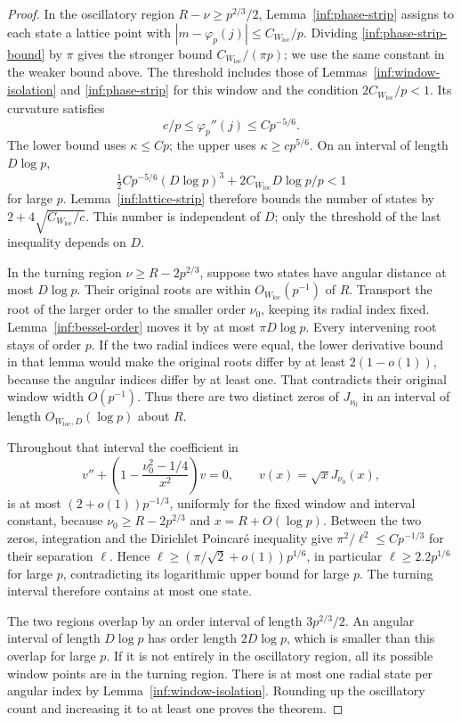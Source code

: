 \begin{proof}
In the oscillatory region $R-\nu\ge p^{2/3}/2$,
Lemma~\ref{inf:phase-strip} assigns to each state a lattice point
with $|m-\varphi_p(j)|\le C_{W_{\mathrm{loc}}}/p$.
Dividing \eqref{inf:phase-strip-bound} by $\pi$ gives the
stronger bound $C_{W_{\mathrm{loc}}}/(\pi p)$; we use the same
constant in the weaker bound above. The threshold includes those
of Lemmas~\ref{inf:window-isolation} and \ref{inf:phase-strip}
for this window and the condition $2C_{W_{\mathrm{loc}}}/p<1$.
Its curvature satisfies
\[
 c/p\le\varphi_p''(j)\le Cp^{-5/6}.
\]
The lower bound uses $\kappa\le Cp$; the upper uses
$\kappa\ge cp^{5/6}$. On an interval of length $D\log p$,
\[
 \tfrac12Cp^{-5/6}(D\log p)^3
       +2C_{W_{\mathrm{loc}}}D\log p/p<1
\]
for large $p$. Lemma~\ref{inf:lattice-strip} therefore bounds the
number of states by
$2+4\sqrt{C_{W_{\mathrm{loc}}}/c}$.
This number is independent of $D$; only the threshold of the
last inequality depends on $D$.

In the turning region $\nu\ge R-2p^{2/3}$, suppose two states
have angular distance at most $D\log p$.
Their original roots are within $O_{W_{\mathrm{loc}}}(p^{-1})$
of $R$. Transport the root of the larger order to the smaller
order $\nu_0$, keeping its radial index fixed.
Lemma~\ref{inf:bessel-order} moves it by at most
$\pi D\log p$. Every intervening root stays of order $p$.
If the two radial indices were equal, the lower derivative bound
in that lemma would make the original roots differ by at least
$2(1-o(1))$, because the angular indices differ by at least one.
That contradicts their original window width $O(p^{-1})$.
Thus there are two distinct zeros of $J_{\nu_0}$ in an interval
of length $O_{W_{\mathrm{loc}},D}(\log p)$ about $R$.

Throughout that interval the coefficient in
\[
 v''+\left(1-\frac{\nu_0^2-1/4}{x^2}\right)v=0,
 \qquad v(x)=\sqrt xJ_{\nu_0}(x),
\]
is at most $(2+o(1))p^{-1/3}$, uniformly for the fixed window
and interval constant, because
$\nu_0\ge R-2p^{2/3}$ and $x=R+O(\log p)$.
Between the two zeros, integration and the Dirichlet Poincar\'e
inequality give
$\pi^2/\ell^2\le Cp^{-1/3}$ for their separation $\ell$.
Hence $\ell\ge(\pi/\sqrt2+o(1))p^{1/6}$, in particular
$\ell\ge2.2p^{1/6}$ for large $p$, contradicting its logarithmic upper
bound for large $p$. The turning interval therefore contains
at most one state.

The two regions overlap by an order interval of length
$3p^{2/3}/2$. An angular interval of length $D\log p$ has order
length $2D\log p$, which is smaller than this overlap for large
$p$. If it is not entirely in the oscillatory region, all its
possible window points are in the turning region.
There is at most one radial state per angular index by
Lemma~\ref{inf:window-isolation}. Rounding up the oscillatory
count and increasing it to at least one proves the theorem.
\end{proof}

